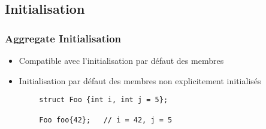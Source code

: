 \documentclass[C++.tex]{subfiles}
\begin{document}
\subsection*{Initialisation}
\begin{frame}[fragile]
	\frametitle{Aggregate Initialisation}
	\begin{itemize}
		\item Compatible avec l'initialisation par défaut des membres
		\item Initialisation par défaut des membres non explicitement initialisés
	\end{itemize}

	\begin{verbatim}
		struct Foo {int i, int j = 5};

		Foo foo{42};   // i = 42, j = 5
	\end{verbatim}


\end{frame}
\end{document}
